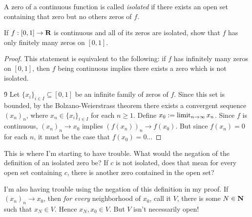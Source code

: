 \documentclass[preview, border=10pt]{standalone}
\begin{document}
    \begin{definition}
        A zero of a continuous function is called \textit{isolated} if there exists an open set containing that zero but no others zeros of $f$.
    \end{definition}
    \begin{proposition}
        If $f:[0,1] \rightarrow \mathbf{R}$ is continuous and all of its zeros are isolated, show that $f$ has only finitely many zeros on $[0,1]$.
    \end{proposition}
        \begin{proof}
            This statement is equivalent to the following: if $f$ has infinitely many zeros on $[0,1]$, then $f$ being continuous implies there exists a zero which is not isolated.
            
            \h9 Let $\{x_i\}_{i \in I} \subseteq [0,1]$ be an infinite family of zeros of $f$. Since this set is bounded, by the Bolzano-Weierstrass theorem there exists a convergent sequence $(x_n)_n$, where $x_n \in \{x_i\}_{i \in I}$ for each $n \geq 1$. Define $x_0 := \operatorname*{limit}_{n \rightarrow \infty}x_n$. Since $f$ is continuous, $(x_n)_n \rightarrow x_0$ implies $(f(x_n))_n \rightarrow f(x_0)$. But since $f(x_n) = 0$ for each $n$, it must be the case that $f(x_0) = 0$...
        \end{proof}
        
        \noindent This is where I'm starting to have trouble. What would the negation of the definition of an isolated zero be? If $c$ is not isolated, does that mean for every open set containing $c$, there is another zero contained in the open set? \nl
        
        \noindent I'm also having trouble using the negation of this definition in my proof. If $(x_n)_n \rightarrow x_0$, then \textit{for every} neighborhood of $x_0$, call it $V$, there is some $N \in \mathbf{N}$ such that $x_N \in V$. Hence $x_N,x_0 \in V$. But $V$ isn't necessarily open!
\end{document}
